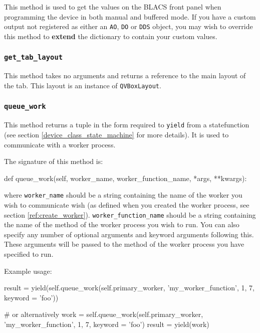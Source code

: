 \documentclass[12pt]{article}
\begin{document}
This method is used to get the values on the BLACS front panel when programming the device in both manual and buffered mode.
If you have a custom output not registered as either an \texttt{AO}, \texttt{DO} or \texttt{DDS} object, you may wish to override this method to \textbf{extend} the dictionary to contain your custom values.

\subsubsection{\texttt{get\_tab\_layout}}\label{ref:get_tab_layout}
This method takes no arguments and returns a reference to the main layout of the tab.
This layout is an instance of \texttt{QVBoxLayout}.

\subsubsection{\texttt{queue\_work}}\label{ref:queue_work}
This method returns a tuple in the form required to \texttt{yield} from a statefunction (see section \ref{device_class_state_machine} for more details).
It is used to communicate with a worker process.

The signature of this method is:
\begin{python}
def queue_work(self, worker_name, worker_function_name, *args, **kwargs):
\end{python}
where \texttt{worker\_name} should be a string containing the name of the worker you wish to communicate wish (as defined when you created the worker process, see section \ref{ref:create_worker}).
\texttt{worker\_function\_name} should be a string containing the name of the method of the worker process you wish to run.
You can also specify any number of optional arguments and keyword arguments following this.
These arguments will be passed to the method of the worker process you have specified to run.

Example usage:
\begin{python}
result = yield(self.queue_work(self.primary_worker, 'my_worker_function',
                                1, 7, keyword = 'foo'))

# or alternatively
work = self.queue_work(self.primary_worker, 'my_worker_function', 
                       1, 7, keyword = 'foo')
result = yield(work)
\end{python}
\end{document}
